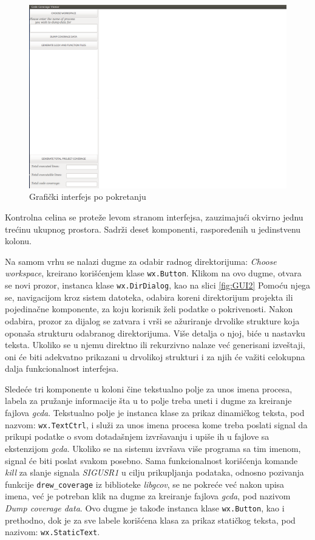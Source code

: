 \documentclass[12pt,oneside]{memoir}
\newcommand{\kod}[1]{\texttt{#1}}
\newcommand{\strano}[1]{\textit{#1}}
\begin{document}
\begin{figure}[!ht]
  \centering
  \label{fig:GUI1}
  \includegraphics[width=\textwidth]{img/GUI_1.png}
  \caption{Grafički interfejs po pokretanju}
  \label{fig:GUI1}
\end{figure}


Kontrolna celina se proteže levom stranom interfejsa, zauzimajući okvirno jednu trećinu ukupnog prostora. Sadrži deset komponenti, raspoređenih u jedinstvenu kolonu. 

Na samom vrhu se nalazi dugme za odabir radnog direktorijuma: \strano{Choose workspace}, kreirano korišćenjem klase \kod{wx.Button}. Klikom na ovo dugme, otvara se novi prozor, instanca klase \kod{wx.DirDialog}, kao na slici \ref{fig:GUI2} Pomoću njega se, navigacijom kroz sistem datoteka, odabira koreni direktorijum projekta ili pojedinačne komponente, za koju korisnik želi podatke o pokrivenosti. Nakon odabira, prozor za dijalog se zatvara i vrši se ažuriranje drvolike strukture koja oponaša strukturu odabranog direktorijuma. Više detalja o njoj, biće u nastavku teksta. Ukoliko se u njemu direktno ili rekurzivno nalaze već generisani izveštaji, oni će biti adekvatno prikazani u drvolikoj strukturi i za njih će važiti celokupna dalja funkcionalnost interfejsa. 

Sledeće tri komponente u koloni čine tekstualno polje za unos imena procesa, labela za pružanje informacije šta u to polje treba uneti i dugme za kreiranje fajlova \strano{gcda}. Tekstualno polje je instanca klase za prikaz dinamičkog teksta, pod nazvom: \kod{wx.TextCtrl}, i služi za unos imena procesa kome treba poslati signal da prikupi podatke o svom dotadašnjem izvršavanju i upiše ih u fajlove sa ekstenzijom \strano{gcda}. Ukoliko se na sistemu izvršava više programa sa tim imenom, signal će biti poslat svakom posebno. Sama funkcionalnost korišćenja komande \strano{kill} za slanje signala \strano{SIGUSR1} u cilju prikupljanja podataka, odnosno pozivanja funkcije \kod{drew\_coverage} iz biblioteke \strano{libgcov}, se ne pokreće već nakon upisa imena, već je potreban klik na dugme za kreiranje fajlova \strano{gcda}, pod nazivom \strano{Dump coverage data}. Ovo dugme je takođe instanca klase \kod{wx.Button}, kao i prethodno, dok je za sve labele korišćena klasa za prikaz statičkog teksta, pod nazivom: \kod{wx.StaticText}. 
\end{document}
